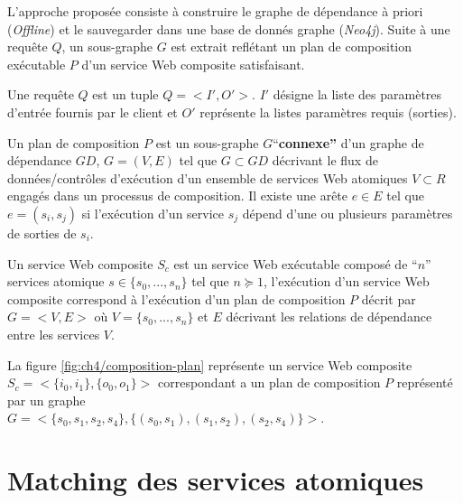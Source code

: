   L'approche proposée consiste à construire le graphe de dépendance à
  priori (\textit{Offline}) et le sauvegarder dans une base de donnés
  graphe (\textit{Neo4j}). Suite à une requête $Q$, un sous-graphe $G$
  est extrait reflétant un plan de composition exécutable $P$ d'un
  service Web composite satisfaisant.

  \begin{mydef}
    Une requête $Q$ est un tuple $Q = <I', O'>$. $I'$ désigne la liste
    des paramètres d'entrée fournis par le client et $O'$ représente
    la listes paramètres requis (sorties).
  \end{mydef}

  

  \begin{mydef}
    Un plan de composition $P$ est un sous-graphe
    $G$``\textbf{connexe''} d'un graphe de dépendance $GD$, $G=(V,E)$
    tel que $G \subset GD$ décrivant le flux de données/contrôles
    d'exécution d'un ensemble de services Web atomiques $V \subset R$
    engagés dans un processus de composition. Il existe une arête $e
    \in E$ tel que $e = (s_i, s_j)$ si l'exécution d'un service $s_j$
    dépend d'une ou plusieurs paramètres de sorties de $s_i$.
  \end{mydef}

  \begin{mydef}
    Un service Web composite $S_c$ est un service Web exécutable
    composé de ``$n$'' services atomique $s \in \{s_0,..., s_n\}$ tel
    que $n \succeq 1$, l'exécution d'un service Web composite
    correspond à l'exécution d'un plan de composition $P$ décrit par
    $G=<V,E>$ où $V = \{s_0, ..., s_n\}$ et $E$ décrivant les
    relations de dépendance entre les services $V$.
  \end{mydef}

  La figure \ref{fig:ch4/composition-plan} représente un service Web
  composite $S_c = <\{i_0, i_1\}, \{o_0, o_1\}>$ correspondant a un
  plan de composition $P$ représenté par un graphe\\ $G =<\{s_0, s_1,
  s_2, s_4\}, \{(s_0, s_1), (s_1, s_2), (s_2, s_4)\}>$.

\section{Matching des services  atomiques}
\label{sec:ch4/matching}

